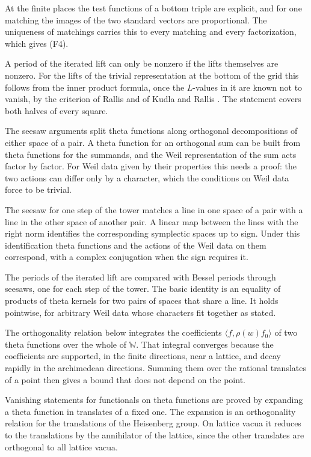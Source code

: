 At the finite places the test functions of a bottom triple are explicit, and
for one matching the images of the two standard vectors are proportional. The
uniqueness of matchings carries this to every matching and every
factorization, which gives (F4).

A period of the iterated lift can only be nonzero if the lifts themselves are
nonzero. For the lifts of the trivial representation at the bottom of the grid
this follows from the inner product formula, once the $L$-values in it are
known not to vanish, by the criterion of Rallis and of Kudla and Rallis
\cite{Ral84,KR94}. The statement covers both halves of every square.

The seesaw arguments split theta functions along orthogonal decompositions of
either space of a pair. A theta function for an orthogonal sum can be built
from theta functions for the summands, and the Weil representation of the sum
acts factor by factor. For Weil data given by their properties this needs a
proof: the two actions can differ only by a character, which the conditions on
Weil data force to be trivial.

The seesaw for one step of the tower matches a line in one space of a pair with
a line in the other space of another pair. A linear map between the lines with
the right norm identifies the corresponding symplectic spaces up to sign. Under
this identification theta functions and the actions of the Weil data on them
correspond, with a complex conjugation when the sign requires it.

The periods of the iterated lift are compared with Bessel periods through
seesaws, one for each step of the tower. The basic identity is an equality of
products of theta kernels for two pairs of spaces that share a line. It holds
pointwise, for arbitrary Weil data whose characters fit together as stated.

The orthogonality relation below integrates the coefficients
$\langle f,\rho(w)f_0\rangle$ of two theta functions over the whole of
$\mathbb W$. That integral converges because the coefficients are supported, in
the finite directions, near a lattice, and decay rapidly in the archimedean
directions. Summing them over the rational translates of a point then gives a
bound that does not depend on the point.

Vanishing statements for functionals on theta functions are proved by expanding
a theta function in translates of a fixed one. The expansion is an
orthogonality relation for the translations of the Heisenberg group. On lattice
vacua it reduces to the translations by the annihilator of the lattice, since
the other translates are orthogonal to all lattice vacua.


